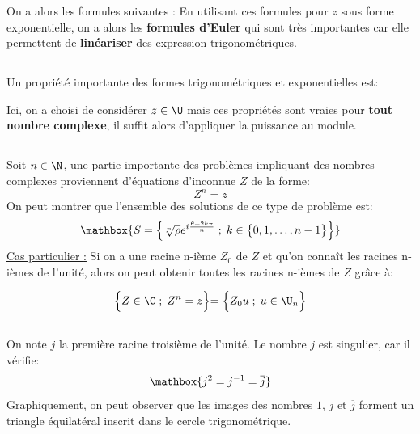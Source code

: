 On a alors les formules suivantes {:}
En utilisant ces formules pour \(z\) sous forme exponentielle, on a alors les \textbf{formules d'Euler} qui sont très importantes car elle permettent de \textbf{linéariser} des expression trigonométriques.\<

\subsection*{}
Un propriété importante des formes trigonométriques et exponentielles est:

Ici, on a choisi de considérer \(z \in \U\) mais ces propriétés sont vraies pour \textbf{tout nombre complexe}, il suffit alors d'appliquer la puissance au module.
\subsection*{}
Soit \(n \in \N\), une partie importante des problèmes impliquant des nombres complexes proviennent d'équations d'inconnue \(Z\) de la forme:
\[
   Z^n = z
\]
On peut montrer que l'ensemble des solutions de ce type de problème est:
\[
   \mathbox{
      S = \Bigl\{ \sqrt[n]{\rho}e^{i\frac{\theta + 2k\pi}{n}}\; ; \; k \in \bigl\{0, 1, \ldots , n-1 \bigl\} \Bigl\}   
   }
\]
\underline{Cas particulier {:}}
Si on a une racine n-ième \(Z_0\) de \(Z\) et qu'on connaît les racines n-ièmes de l'unité, alors on peut obtenir toutes les racines n-ièmes de \(Z\) grâce à:

\[
   \Bigl\{ Z \in \C \; ; \; Z^n = z \Bigl\} = \Bigl\{ Z_0u \; ; \; u \in \U_n \Bigl\}   
\]
\subsection*{}
On note \(j\) la première racine troisième de l'unité.
Le nombre \(j\) est singulier, car il vérifie:
\[
    \mathbox{
       j^2 = j^{-1} = \overline{j}
    }
\]
Graphiquement, on peut observer que les images des nombres \(1\), \(j\) et \(\overline{j}\) forment un triangle équilatéral inscrit dans le cercle trigonométrique.

